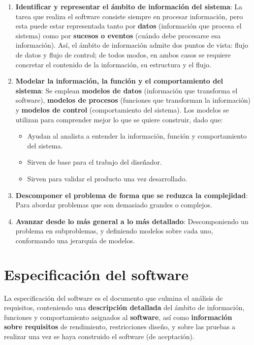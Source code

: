 \begin{enumerate}
    \item \textbf{Identificar y representar el ámbito de información del sistema}: La tarea que realiza el software consiste siempre en procesar información, pero esta puede estar representada tanto por \textbf{datos} (información que procesa el sistema) como por \textbf{sucesos o eventos} (cuándo debe procesarse esa información). Así, el ámbito de información admite dos puntos de vista: flujo de datos y flujo de control; de todos modos, en ambos casos se requiere concretar el contenido de la información, su estructura y el flujo.
    \item \textbf{Modelar la información, la función y el comportamiento del sistema}: Se emplean \textbf{modelos de datos} (información que transforma el software), \textbf{modelos de procesos} (funciones que transforman la información) y \textbf{modelos de control} (comportamiento del sistema). Los modelos se utilizan para comprender mejor lo que se quiere construir, dado que:
          \begin{itemize}
              \item Ayudan al analista a entender la información, función y comportamiento del sistema.
              \item Sirven de base para el trabajo del diseñador.
              \item Sirven para validar el producto una vez desarrollado.
          \end{itemize}
    \item \textbf{Descomponer el problema de forma que se reduzca la complejidad}: Para abordar problemas que son demasiado grandes o complejos.
    \item \textbf{Avanzar desde lo más general a lo más detallado}: Descomponiendo un problema en subproblemas, y definiendo modelos sobre cada uno, conformando una jerarquía de modelos.
\end{enumerate}


\section{Especificación del software}

La especificación del software es el documento que culmina el análisis de requisitos, conteniendo una \textbf{descripción detallada} del ámbito de información, funciones y comportamiento asignados al \textbf{software}, así como \textbf{información sobre requisitos} de rendimiento, restricciones diseño, y sobre las pruebas a realizar una vez se haya construido el software (de aceptación).


